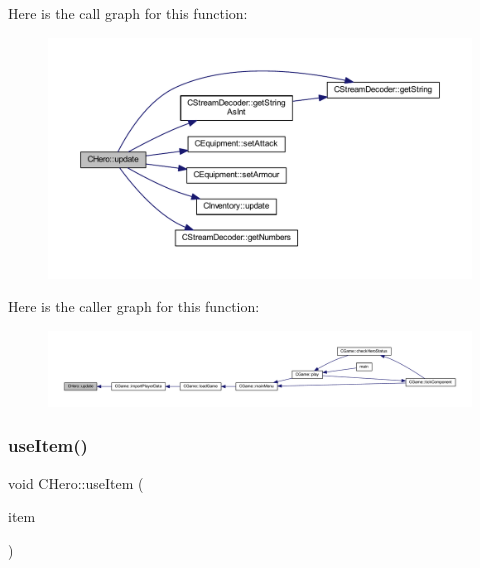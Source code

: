 Here is the call graph for this function\+:\nopagebreak
\begin{figure}[H]
\begin{center}
\leavevmode
\includegraphics[width=350pt]{class_c_hero_a7b1a1b3c196bbe5b8da97c56f520c1f3_cgraph}
\end{center}
\end{figure}
Here is the caller graph for this function\+:\nopagebreak
\begin{figure}[H]
\begin{center}
\leavevmode
\includegraphics[width=350pt]{class_c_hero_a7b1a1b3c196bbe5b8da97c56f520c1f3_icgraph}
\end{center}
\end{figure}
\mbox{\label{class_c_hero_ae6ef1be1a9d01855208eeb82292e9f76}} 
\subsubsection{\texorpdfstring{use\+Item()}{useItem()}}
{\footnotesize\ttfamily void C\+Hero\+::use\+Item (\begin{DoxyParamCaption}\item[{const \mbox{\hyperlink{class_c_item}{C\+Item}} \&}]{item }\end{DoxyParamCaption})\hspace{0.3cm}{\ttfamily [inline]}}

